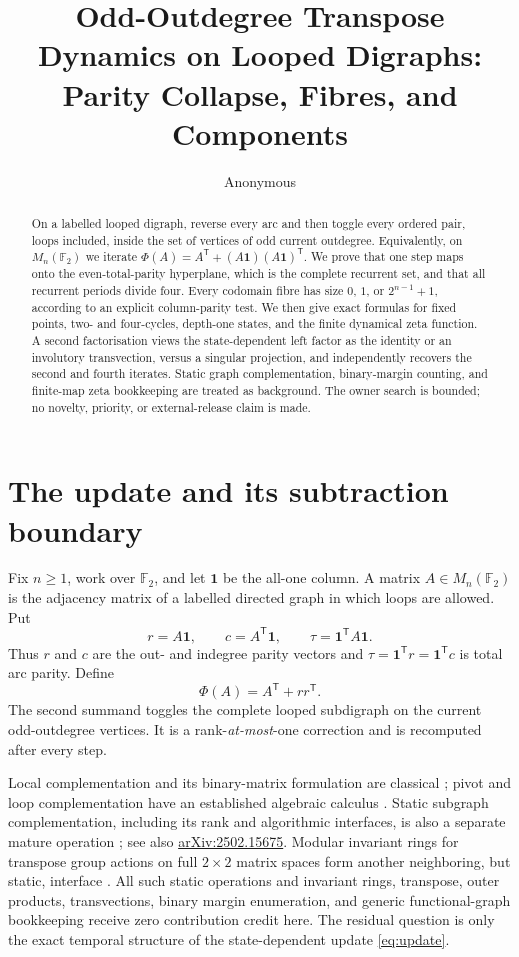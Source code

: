 \documentclass[10pt,a4paper]{amsart}
\title[Odd-outdegree transpose dynamics]{Odd-Outdegree Transpose Dynamics on Looped Digraphs:\\
Parity Collapse, Fibres, and Components}
\author{Anonymous}
\date{}
\theoremstyle{definition}
\theoremstyle{remark}
\newcommand{\F}{\mathbb F_2}
\newcommand{\one}{\mathbf 1}
\begin{document}
\begin{abstract}
On a labelled looped digraph, reverse every arc and then toggle every ordered
pair, loops included, inside the set of vertices of odd current outdegree.
Equivalently, on $M_n(\mathbb F_2)$ we iterate
$\Phi(A)=A^{\mathsf T}+(A\mathbf1)(A\mathbf1)^{\mathsf T}$.
We prove that one step maps onto the even-total-parity hyperplane, which is
the complete recurrent set, and that all recurrent periods divide four.
Every codomain fibre has size $0$, $1$, or $2^{n-1}+1$, according to an
explicit column-parity test.  We then give exact formulas for fixed points,
two- and four-cycles, depth-one states, and the finite dynamical zeta
function.  A second factorisation views the state-dependent left factor as
the identity or an involutory transvection, versus a singular projection,
and independently recovers the second and fourth iterates.  Static graph
complementation, binary-margin counting, and finite-map zeta bookkeeping are
treated as background.  The owner search is bounded; no novelty, priority,
or external-release claim is made.
\end{abstract}

\maketitle

\section{The update and its subtraction boundary}

Fix $n\geq1$, work over $\F$, and let $\one$ be the all-one column.  A matrix
$A\in M_n(\F)$ is the adjacency matrix of a labelled directed graph in which
loops are allowed.  Put
\[
 r=A\one,\qquad c=A^{\mathsf T}\one,\qquad
 \tau=\one^{\mathsf T}A\one.
\]
Thus $r$ and $c$ are the out- and indegree parity vectors and
$\tau=\one^{\mathsf T}r=\one^{\mathsf T}c$ is total arc parity.  Define
\begin{equation}
 \Phi(A)=A^{\mathsf T}+rr^{\mathsf T}.                 \label{eq:update}
\end{equation}
The second summand toggles the complete looped subdigraph on the current
odd-outdegree vertices.  It is a rank-\emph{at-most}-one correction and is
recomputed after every step.

Local complementation and its binary-matrix formulation are classical
\cite{Bouchet1993,Traldi2012}; pivot and loop complementation have an
established algebraic calculus \cite{BrijderHoogeboom2011}.  Static subgraph
complementation, including its rank and algorithmic interfaces, is also a
separate mature operation \cite{BuchananEtAl2022,KochPardalSantos2025}; see
also \href{https://arxiv.org/abs/2502.15675}{arXiv:2502.15675}.  Modular
invariant rings for transpose group actions on full $2\times2$ matrix spaces
form another neighboring, but static, interface \cite{ChenRen2026}.
All such static operations and invariant rings, transpose, outer products,
transvections, binary margin enumeration, and generic functional-graph
bookkeeping receive zero contribution credit here.  The residual question is
only the exact temporal structure of the state-dependent update
\eqref{eq:update}.
\end{document}

